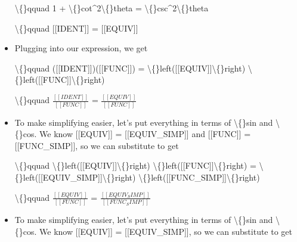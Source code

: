 \documentclass{article}
\begin{document}
\begin{itemize}
                        \textbackslash\{\}qquad 1 + \textbackslash\{\}cot\textasciicircum{}2\textbackslash\{\}theta = \textbackslash\{\}csc\textasciicircum{}2\textbackslash\{\}theta
                    
                    \textbackslash\{\}qquad [[IDENT]] 
                        = [[EQUIV]]
  \item Plugging into our expression, we get
                    
                        \textbackslash\{\}qquad
                            ([[IDENT]])([[FUNC]])
                            =
                            \textbackslash\{\}left([[EQUIV]]\textbackslash\{\}right)
                            \textbackslash\{\}left([[FUNC]]\textbackslash\{\}right) 
                        
                    
                    
                        \textbackslash\{\}qquad
                            $\frac{[[IDENT]]}{[[FUNC]]}$
                            = 
                            $\frac{[[EQUIV]]}{[[FUNC]]}$
  \item To make simplifying easier, let's put everything
                    in terms of \textbackslash\{\}sin and \textbackslash\{\}cos.
                    We know [[EQUIV]] 
                        = [[EQUIV\_SIMP]]
                    and [[FUNC]] = [[FUNC\_SIMP]],
                    so we can substitute to get
                    
                        \textbackslash\{\}qquad 
                            \textbackslash\{\}left([[EQUIV]]\textbackslash\{\}right)
                            \textbackslash\{\}left([[FUNC]]\textbackslash\{\}right) 
                            =
                            \textbackslash\{\}left([[EQUIV\_SIMP]]\textbackslash\{\}right)
                            \textbackslash\{\}left([[FUNC\_SIMP]]\textbackslash\{\}right) 
                        
                    
                    
                        \textbackslash\{\}qquad
                            $\frac{[[EQUIV]]}{[[FUNC]]}$
                            =
                            $\frac{[[EQUIV_SIMP]]}{[[FUNC_SIMP]]}$
  \item To make simplifying easier, let's put everything
                    in terms of \textbackslash\{\}sin and \textbackslash\{\}cos.
                    We know [[EQUIV]]
                        = [[EQUIV\_SIMP]], so we can substitute
                    to get
                    

\end{itemize}
\end{document}

